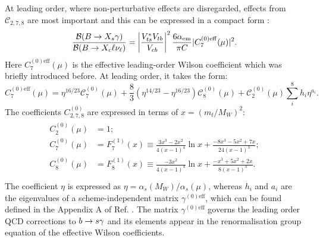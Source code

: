 At leading order, where non-perturbative effects are disregarded, effects from $\mathcal{C}_{2,7,8}$ are most important and this can be expressed in a compact form \cite{Buras:1993xp}:
\begin{equation}\label{eq:total_decay_rate_leading_order}
    \frac{\mathcal{B}(\BtoXsgamma)}{\mathcal{B}(\B\to X_c\ell\nu_\ell)} = \left|\frac{V_{ts}^*V_{tb}}{V_{cb}}\right|^2\frac{6\alpha_{\mathrm{em}}}{\pi C}|C_{7}^{(0)\mathrm{eff}}(\mu)|^2.
\end{equation}
Here $C_{7}^{(0)\mathrm{eff}}(\mu)$ is the effective leading-order Wilson coefficient which was briefly introduced before.
At leading order, it takes the form:
\begin{equation}\label{eq:effective_c7}
    C_{7}^{(0)\mathrm{eff}}(\mu) = \eta^{16/23}\mathcal{C}^{(0)}_7(\mu) + \frac{8}{3} \left(\eta^{14/23}-\eta^{16/23}\right)\mathcal{C}^{(0)}_8(\mu) + \mathcal{C}^{(0)}_2(\mu) \sum_i^8h_i\eta^{a_i}.
\end{equation}
The \SM coefficients $C_{2,7,8}^{(0)}$ are expressed in terms of $x=(m_t/M_W)^2$:
\begin{align}\label{eq:leading_order_wilson_coeffs}
    \begin{split}
    C_2^{(0)}(\mu) &= 1;\\
    C_7^{(0)}(\mu) &= F_7^{(1)}(x) \equiv \frac{3x^3-2x^2}{4(x-1)^4}\ln x + \frac{-8x^3-5x^2+7x}{24(x-1)^3};\\
    C_8^{(0)}(\mu) &= F_8^{(1)}(x) \equiv \frac{-3x^2}{4(x-1)^4}\ln x + \frac{-x^3+5x^2+2x}{8(x-1)^3}.\\
    \end{split}
\end{align}
The coefficient $\eta$ is expressed as $\eta=\alpha_s(M_W)/\alpha_s(\mu)$, whereas $h_i$ and $a_i$ are the eigenvalues of a scheme-independent matrix $\gamma^{(0)\mathrm{eff}}$, which can be found defined in the Appendix A of Ref. \cite{Buras:1993xp}.
The matrix $\gamma^{(0)\mathrm{eff}}$ governs the leading order QCD corrections to $b\rightarrow s\gamma$ and its elements appear in the renormalisation group equation of the effective Wilson coefficients.

